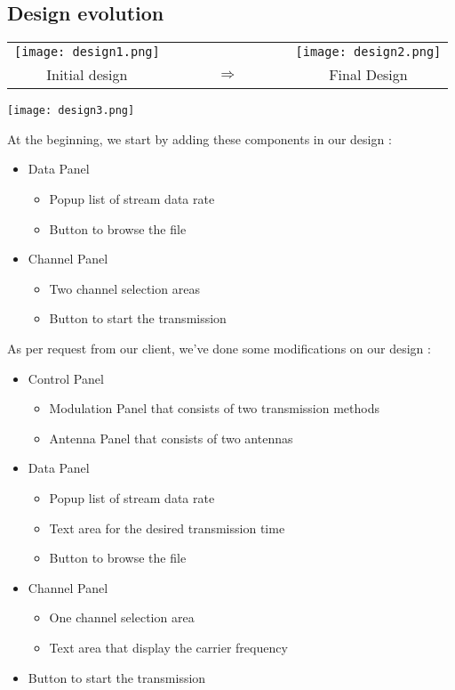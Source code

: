 \documentclass[12pt,a4paper]{article}
\begin{document}
\subsection{Design evolution}
\begin{center}
\begin{tabular}{c r r r c r r r c}
\texttt{[image: design1.png]}

&&&&&&&&\texttt{[image: design2.png]}\\

Initial design &&&&$\Rightarrow$&&&& Final Design
\end{tabular}
\end{center}
\begin{center}
\texttt{[image: design3.png]}
\end{center}
\par At the beginning, we start by adding these components in our design :
\begin{itemize}
	\item Data Panel
	\begin{itemize}
		\item Popup list of stream data rate 
		\item Button to browse the file
	\end{itemize}
	\item Channel Panel
	\begin{itemize}
		\item Two channel selection areas 
		\item Button to start the transmission
	\end{itemize}
\end{itemize}
\par As per request from our client, we've done some modifications on our design :
\begin{itemize}
	\item Control Panel
	\begin{itemize}
		\item Modulation Panel that consists of two transmission methods
		\item Antenna Panel that consists of two antennas
	\end{itemize}
	\item Data Panel
	\begin{itemize}
		\item Popup list of stream data rate
		\item Text area for the desired transmission time
		\item Button to browse the file 
	\end{itemize}
	\item Channel Panel
	\begin{itemize}
		\item One channel selection area
		\item Text area that display the carrier frequency 
	\end{itemize}
	\item Button to start the transmission
\end{itemize}
 
\end{document}
